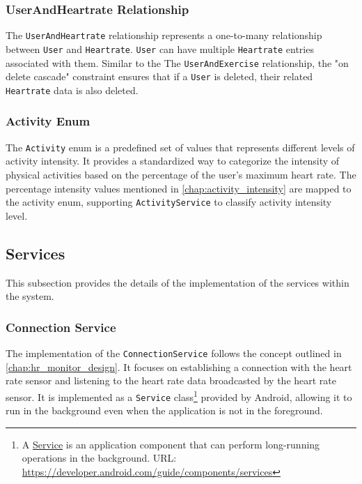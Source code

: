 \subsubsection{UserAndHeartrate Relationship}
The \verb;UserAndHeartrate; relationship represents a one-to-many relationship between \verb;User; and \verb;Heartrate;. 
\verb;User; can have multiple \verb;Heartrate; entries associated with them. Similar to the The \verb;UserAndExercise; relationship, the "on delete cascade" constraint ensures that if a \verb;User; is deleted, their related \verb;Heartrate; data is also deleted.

\subsubsection{Activity Enum}
The \verb;Activity; enum is a predefined set of values that represents different levels of activity intensity. 
It provides a standardized way to categorize the intensity of physical activities based on the percentage of the user's maximum heart rate. 
The percentage intensity values mentioned in \autoref{chap:activity_intensity} are mapped to the activity enum, supporting \verb;ActivityService; to classify activity intensity level.


\subsection{Services}
This subsection provides the details of the implementation of the services within the system.

\subsubsection{Connection Service}
The implementation of the \verb;ConnectionService; follows the concept outlined in \autoref{chap:hr_monitor_design}. It focuses on establishing a connection with the heart rate sensor and listening to the heart rate data broadcasted by the heart rate sensor. 
It is implemented as a \verb;Service; class\footnote{A \url{Service} is an application component that can perform long-running operations in the background. URL: \url{https://developer.android.com/guide/components/services}} provided by Android, allowing it to run in the background even when the application is not in the foreground.

